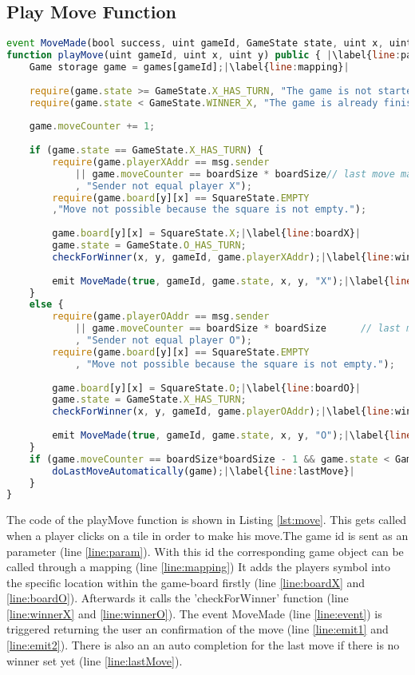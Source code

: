 \subsection{Play Move Function}\label{subsec:move}
	\begin{lstlisting}[caption={Play Move Function on the Smart Contract}, label={lst:move},language=JavaScript,escapechar=|]
event MoveMade(bool success, uint gameId, GameState state, uint x, uint y, string symbol);|\label{line:event}| 
function playMove(uint gameId, uint x, uint y) public { |\label{line:param}| 
	Game storage game = games[gameId];|\label{line:mapping}|
		    
	require(game.state >= GameState.X_HAS_TURN, "The game is not started yet.");
	require(game.state < GameState.WINNER_X, "The game is already finished.");
		    
	game.moveCounter += 1;
		    
	if (game.state == GameState.X_HAS_TURN) {
		require(game.playerXAddr == msg.sender
			|| game.moveCounter == boardSize * boardSize// last move made 	automatically
			, "Sender not equal player X");
		require(game.board[y][x] == SquareState.EMPTY
		,"Move not possible because the square is not empty.");
		    
		game.board[y][x] = SquareState.X;|\label{line:boardX}|
		game.state = GameState.O_HAS_TURN;
		checkForWinner(x, y, gameId, game.playerXAddr);|\label{line:winnerX}|
		    
		emit MoveMade(true, gameId, game.state, x, y, "X");|\label{line:emit1}|
	}
	else {
		require(game.playerOAddr == msg.sender
			|| game.moveCounter == boardSize * boardSize      // last move made automatically
			, "Sender not equal player O");
		require(game.board[y][x] == SquareState.EMPTY
			, "Move not possible because the square is not empty.");
		    
		game.board[y][x] = SquareState.O;|\label{line:boardO}|
		game.state = GameState.X_HAS_TURN;
		checkForWinner(x, y, gameId, game.playerOAddr);|\label{line:winnerO}|
		    
		emit MoveMade(true, gameId, game.state, x, y, "O");|\label{line:emit2}|
	}
	if (game.moveCounter == boardSize*boardSize - 1 && game.state < GameState.WINNER_X) {
		doLastMoveAutomatically(game);|\label{line:lastMove}|
	}
}
\end{lstlisting}
The code of the playMove function is shown in Listing \ref{lst:move}. This gets called when a player clicks on a tile in order to make his move.The game id is sent as an parameter (line \ref{line:param}). With this id the corresponding game object can be called through a mapping (line \ref{line:mapping})  It adds the players symbol into the specific location within the game-board firstly (line \ref{line:boardX} and \ref{line:boardO}). Afterwards it calls the 'checkForWinner' function (line \ref{line:winnerX} and \ref{line:winnerO}). The event MoveMade (line \ref{line:event}) is triggered returning the user an confirmation of the move (line \ref{line:emit1} and \ref{line:emit2}). There is also an an auto completion for the last move if there is no winner set yet (line \ref{line:lastMove}).



